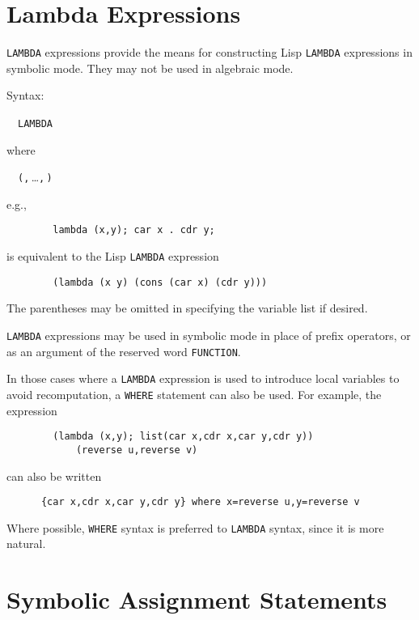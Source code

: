\section{Lambda Expressions}
\hypertarget{reserved:LAMBDA}{}
\label{sec-lambda}

\texttt{LAMBDA} expressions provide the means for constructing Lisp \texttt{LAMBDA}
expressions in symbolic mode. They may not be used in algebraic mode.

Syntax:
\begin{syntax}
  \ \BNFprod\
    \texttt{LAMBDA } 
\end{syntax}
 where
\begin{syntax}
  \ \BNFprod\ \texttt{(}\texttt{,}\,\dots\texttt{,}\,\texttt{)}
\end{syntax}
e.g.,
\begin{verbatim}
        lambda (x,y); car x . cdr y;
\end{verbatim}
is equivalent to the Lisp \texttt{LAMBDA} expression
\begin{verbatim}
        (lambda (x y) (cons (car x) (cdr y)))
\end{verbatim}
The parentheses may be omitted in specifying the variable list if desired.

\texttt{LAMBDA} expressions may be used in symbolic mode in place of prefix
operators, or as an argument of the reserved word \texttt{FUNCTION}.

In those cases where a \texttt{LAMBDA} expression is used to introduce local
variables to avoid recomputation, a \texttt{WHERE} statement can also be
used.  For example, the expression
\begin{verbatim}
        (lambda (x,y); list(car x,cdr x,car y,cdr y))
            (reverse u,reverse v)
\end{verbatim}
can also be written
\begin{verbatim}
      {car x,cdr x,car y,cdr y} where x=reverse u,y=reverse v
\end{verbatim}
Where possible, \texttt{WHERE} syntax is preferred to \texttt{LAMBDA} syntax,
since it is more natural.

\section{Symbolic Assignment Statements}
\hypertarget{command:SETQ}{}

